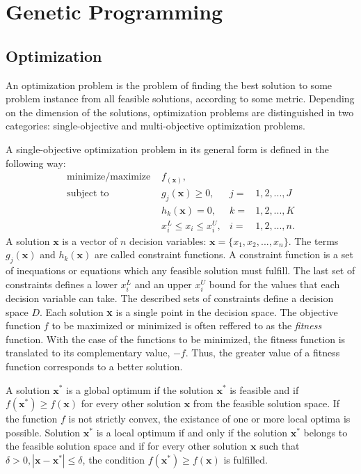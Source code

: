 \chapter{Genetic Programming}
\section{Optimization}
An optimization problem is the problem of finding the best solution to some problem instance from all feasible solutions, according to some metric.
Depending on the dimension of the solutions, optimization problems are distinguished in two categories: single-objective and multi-objective optimization problems.

A single-objective optimization problem in its general form is defined in the following way:
\begin{align*}
\label{opt_problem}
\text{minimize/maximize } & f_(\textbf{x}),   \\
\text{subject to } & g_j(\textbf{x}) \geq 0, & j = & 1, 2, ..., J \\
           & h_k(\textbf{x}) = 0, & k = & 1, 2, ..., K \\
           & x_{i}^{L} \leq x_i \leq x_{i}^{U}, & i = & 1, 2, ..., n. 
\end{align*}
A solution $\textbf{x}$ is a vector of $n$ decision variables: $\textbf{x} = \{x_1,x_2,...,x_n\}$.
The terms $g_j(\textbf{x})$ and $h_k(\textbf{x})$ are called constraint functions. 
A constraint function is a set of inequations or equations which any feasible solution must fulfill. 
The last set of constraints defines a lower $x_{i}^{L}$ and an upper $x_{i}^{U}$ bound for the values that each decision variable can take. 
The described sets of constraints define a decision space $D$.
Each solution \textbf{x} is a single point in the decision space.
The objective function $f$ to be maximized or minimized is often reffered to as the \textit{fitness} function.
With the case of the functions to be minimized, the fitness function is translated to its complementary value, $-f$.
Thus, the greater value of a fitness function corresponds to a better solution.

A solution $\textbf{x}^{*}$ is a global optimum if the solution $\textbf{x}^{*}$ is feasible and if $f(\textbf{x}^{*}) \geq f(\textbf{x})$ for every other solution $\textbf{x}$ from the feasible solution space.
If the function $f$ is not strictly convex, the existance of one or more local optima is possible.
Solution $\textbf{x}^{*}$ is a local optimum if and only if the solution $\textbf{x}^{*}$ belongs to the feasible solution space and if for every other solution $\textbf{x}$ such that 
$\delta > 0, |\textbf{x} - \textbf{x}^{*}| \leq \delta$, the condition $f(\textbf{x}^{*}) \geq f(\textbf{x})$ is fulfilled.

